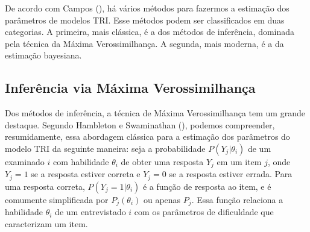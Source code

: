 \documentclass[
	12pt,				%
	openright,			%
	twoside,			%
	a4paper,			%
	english,			%
	brazil				%
	]{abntex2}
\begin{document}
 De acordo com Campos (\citeyear{campos2016}), há vários métodos para fazermos a estimação dos parâmetros de modelos TRI. Esse métodos podem ser classificados em duas categorias. A primeira, mais clássica, é a dos métodos de inferência, dominada pela técnica da Máxima Verossimilhança.  A segunda, mais moderna, é a da estimação bayesiana.
 
 \subsection{Inferência via Máxima Verossimilhança}
 Dos métodos de inferência, a técnica de Máxima Verossimilhança tem um grande destaque. Segundo Hambleton e Swaminathan (\citeyear{hambswam1985}), podemos compreender, resumidamente, essa abordagem clássica para a estimação dos parâmetros do modelo TRI da seguinte maneira: seja a probabilidade $P(Y_{j} | \theta_{i})$ de um examinado $i$ com habilidade $\theta_{i}$ de obter uma resposta $Y_{j}$ em um item $j$, onde $Y_{j} = 1$ se a resposta estiver correta e $Y_{j} = 0$ se a resposta estiver errada. Para uma resposta correta, $P(Y_{j} = 1 | \theta_{i})$ é a função de resposta ao item, e é comumente simplificada por $P_{j}(\theta_{i})$ ou apenas $P_{j}$. Essa função relaciona a habilidade $\theta_{i}$ de um entrevistado $i$ com os parâmetros de dificuldade que caracterizam um item.
 
\end{document}
